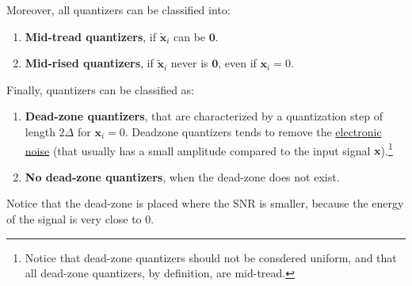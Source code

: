 Moreover, all quantizers can be classified into:
\begin{enumerate}
\item \textbf{Mid-tread quantizers}, if $\tilde{{\mathbf x}}_i$ can be ${\mathbf 0}$.
\item \textbf{Mid-rised quantizers}, if $\tilde{{\mathbf x}}_i$ never is ${\mathbf 0}$,
  even if ${\mathbf x}_i=0$.
\end{enumerate}

Finally, quantizers can be classified as:
\begin{enumerate}
\item \textbf{Dead-zone quantizers}, that are characterized by a
  quantization step of length $2\Delta$ for ${\mathbf
    x}_i=0$. Deadzone quantizers tends to remove the
  \href{https://en.wikipedia.org/wiki/Noise_(electronics)}{electronic
    noise} (that usually has a small amplitude compared to the input
  signal ${\mathbf x}$).\footnote{Notice that dead-zone quantizers
    should not be consdered uniform, and that all dead-zone
    quantizers, by definition, are mid-tread.}
\item \textbf{No dead-zone quantizers}, when the dead-zone does not
  exist.
\end{enumerate}

Notice that the dead-zone is placed where the SNR is smaller, because
the energy of the signal is very close to 0.

\begin{comment}
\begin{figure}
  \centering
  \myfig{io_map_mr}{5cm}{500}
  \caption{Input/output mapping of a mid-riser quantizer with $\Delta=2$.}
  \label{fig:iomap_mr}
\end{figure}

\begin{figure}
  \centering
  \myfig{qe_mr}{5cm}{500}
  \caption{Quantization error of a mid-riser quantizer with $\Delta=2$.}
  \label{fig:qe_mr}
\end{figure}

\begin{figure}
  \centering
  \myfig{io_map_mt}{5cm}{500}
  \caption{Input/output map of a mid-tread quantizer with $\Delta=2$.}
  \label{fig:iomap_mt}
\end{figure}

\begin{figure}
  \centering
  \myfig{qe_mt}{5cm}{500}
  \caption{Quantization error of a mid-tread quantizer with $\Delta=2$.}
  \label{fig:qe_mt}
\end{figure}

\begin{figure}
  \centering
  \myfig{io_map_dz}{5cm}{500}
  \caption{Input/output map of a dead-zone quantizer with $\Delta=2$.}
  \label{fig:iomap_dz}
\end{figure}

\begin{figure}
  \centering
  \myfig{qe_dz}{5cm}{500}
  \caption{Quantization error of a dead-zone quantizer with $\Delta=2$.}
  \label{fig:qe_dz}
\end{figure}
\end{comment}

